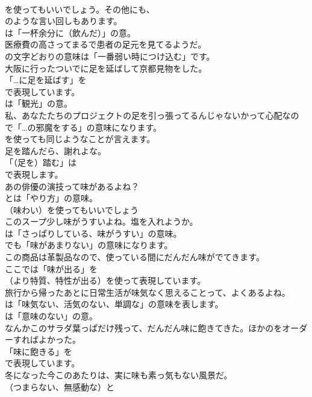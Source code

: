 \documentclass[8pt]{extreport}
\begin{document}
\begin{CJK}{UTF8}{min}
\\	を使ってもいいでしょう。その他にも、
\\	のような言い回しもあります。
\\	は「一杯余分に（飲んだ）」の意。
\\	医療費の高さってまるで患者の足元を見てるようだ。 
\\	の文字どおりの意味は「一番弱い時につけ込む」です。	
\\	大阪に行ったついでに足を延ばして京都見物をした。 
\\	「…に足を延ばす」を 
\\	で表現しています。
\\	は「観光」の意。	
\\	私、あなたたちのプロジェクトの足を引っ張ってるんじゃないかって心配なの 
\\	で「…の邪魔をする」の意味になります。
\\	を使っても同じようなことが言えます。	
\\	足を踏んだら、謝れよな。 
\\	「（足を）踏む」は 
\\	で表現します。	
\\	あの俳優の演技って味があるよね？ 
\\	とは「やり方」の意味。
\\	（味わい）を使ってもいいでしょう	
\\	このスープ少し味がうすいよね。塩を入れようか。 
\\	は「さっぱりしている、味がうすい」の意味。
\\	でも「味があまりない」の意味になります。	
\\	この商品は革製品なので、使っている間にだんだん味がでてきます。 
\\	ここでは「味が出る」を 
\\	（より特質、特性が出る）を使って表現しています。	
\\	旅行から帰ったあとに日常生活が味気なく思えることって、よくあるよね。 
\\	は「味気ない、活気のない、単調な」の意味を表します。
\\	は「意味のない」の意。	
\\	なんかこのサラダ葉っぱだけ残って、だんだん味に飽きてきた。ほかのをオーダーすればよかった。 
\\	「味に飽きる」を 
\\	で表現しています。	
\\	冬になった今このあたりは、実に味も素っ気もない風景だ。 
\\	（つまらない、無感動な）と 

\end{CJK}
\end{document}
